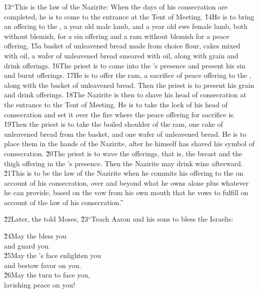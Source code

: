 \v{13}``This is the law of the Nazirite: When the days of his consecration are completed, he is to come to the entrance at the Tent of Meeting. \v{14}He is to bring an offering to the , a year old male lamb, and a year old ewe female lamb, both without blemish, for a sin offering and a ram without blemish for a peace offering, \v{15}a basket of unleavened bread made from choice flour, cakes mixed with oil, a wafer of unleavened bread smeared with oil, along with grain and drink offerings. \v{16}The priest is to come into the 's presence and present his sin and burnt offerings. \v{17}He is to offer the ram, a sacrifice of peace offering to the , along with the basket of unleavened bread. Then the priest is to present his grain and drink offerings. \v{18}The Nazirite is then to shave his head of consecration at the entrance to the Tent of Meeting. He is to take the lock of his head of consecration and set it over the fire where the peace offering for sacrifice is. \v{19}Then the priest is to take the boiled shoulder of the ram, one cake of unleavened bread from the basket, and one wafer of unleavened bread. He is to place them in the hands of the Nazirite, after he himself has shaved his symbol of consecration. \v{20}The priest is to wave the offerings, that is, the breast and the thigh offering in the 's presence. Then the Nazirite may drink wine afterward. \v{21}This is to be the law of the Nazirite when he commits his offering to the  on account of his consecration, over and beyond what he owns alone plus whatever he can provide, based on the vow from his own mouth that he vows to fulfill on account of the law of his consecration.''

\v{22}Later, the  told Moses, \v{23}``Teach Aaron and his sons to bless the Israelis:

\begin{poetry}
\poeml \v{24}May the  bless you \\
\poemll    and guard you. \\
\poeml \v{25}May the 's face enlighten you \\
\poemll    and bestow favor on you. \\
\poeml \v{26}May the  turn to face you, \\
\poemll    lavishing peace on you!
\end{poetry}

